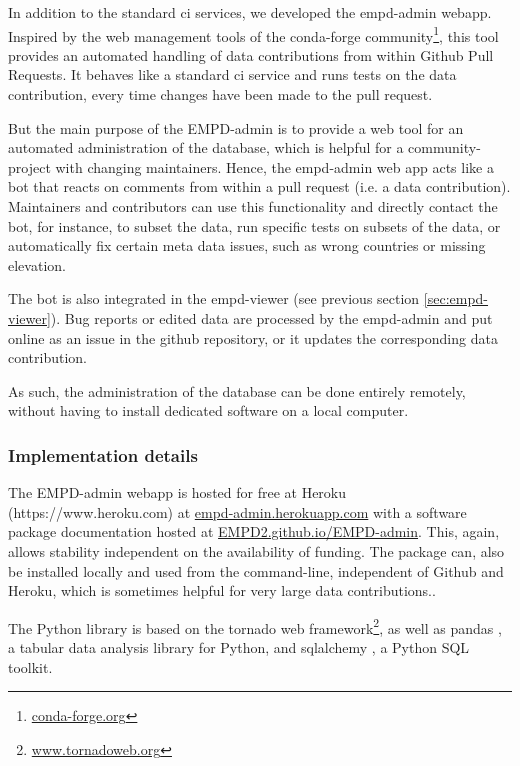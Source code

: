 \begin{refsection}
In addition to the standard \gls{ci} services, we developed the \gls{empd}-admin webapp. Inspired by the web management tools of the conda-forge community\footnote{\href{https://conda-forge.org}{conda-forge.org}}, this tool provides an automated handling of data contributions from within Github Pull Requests. It behaves like a standard \gls{ci} service and runs tests on the data contribution, every time changes have been made to the pull request. 

But the main purpose of the EMPD-admin is to provide a web tool for an automated administration of the database, which is helpful for a community-project with changing maintainers. Hence, the \gls{empd}-admin web app acts like a bot that reacts on comments from within a pull request (i.e. a data contribution). Maintainers and contributors can use this functionality and directly contact the bot, for instance, to subset the data, run specific tests on subsets of the data, or automatically fix certain meta data issues, such as wrong countries or missing elevation. 

The bot is also integrated in the \gls{empd}-viewer (see previous section \ref{sec:empd-viewer}). Bug reports or edited data are processed by the \gls{empd}-admin and put online as an issue in the github repository, or it updates the corresponding data contribution.

As such, the administration of the database can be done entirely remotely, without having to install dedicated software on a local computer.

\subsubsection{Implementation details}
The EMPD-admin webapp is hosted for free at Heroku (https://www.heroku.com) at \href{https://empd-admin.herokuapp.com/}{empd-admin.herokuapp.com} with a software package documentation hosted at \href{https://EMPD2.github.io/EMPD-admin}{{EMPD2.github.io/EMPD-admin}}. This, again, allows stability independent on the availability of funding. The package can, also be installed locally and used from the command-line, independent of Github and Heroku, which is sometimes helpful for very large data contributions..

The Python library is based on the tornado web framework\footnote{\href{https://www.tornadoweb.org/en/stable/}{www.tornadoweb.org}}, as well as pandas \citep{McKinney2010}, a tabular data analysis library for Python, and sqlalchemy \citep{Bayer2012}, a Python SQL toolkit.


\end{refsection}
